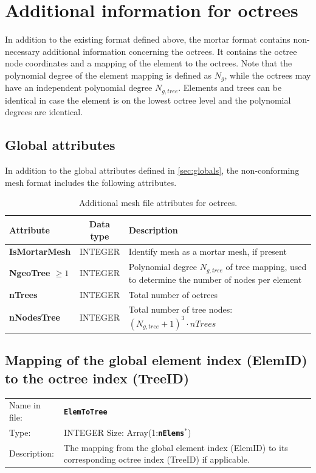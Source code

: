 \documentclass[a4paper,headsepline]{scrreprt}
\newcommand\Ngeo{N_g}
\newcommand\NgeoTree{N_{g,tree}}
\newcommand\ttbf[1]{\textbf{\texttt{#1}}}
\newcommand\nElems{\ttbf{nElems}}
\begin{document}
\newpage
\section{Additional information for octrees}

In addition to the existing format defined above, the mortar format contains non-necessary additional information concerning the octrees. It contains the octree node coordinates and a mapping of the element to the octrees. Note that the polynomial degree of the element mapping is defined as $\Ngeo$, while the octrees may have an independent polynomial degree $\NgeoTree$. Elements and trees can be identical in case the element is on the lowest octree level and the polynomial degrees are identical.


\subsection{Global attributes}
In addition to the global attributes defined in \ref{sec:globals}, the non-conforming mesh format includes the following attributes.

\begin{table}[h!]
\centering
\begin{tabularx}{1.0\textwidth}{|>{\bfseries\ttfamily}l|c|X|} \hline
\normalfont\textbf{Attribute}   & \textbf{Data type}  & \textbf{Description} \\ \hline\hline
IsMortarMesh  & INTEGER & Identify mesh as a mortar mesh, if present \\\hline
NgeoTree $\geq 1$ & INTEGER & Polynomial degree $\NgeoTree$ of tree mapping, used to determine the number of nodes per element \\\hline
nTrees        & INTEGER & Total number of octrees \\\hline
nNodesTree    & INTEGER & Total number of tree nodes: $(\NgeoTree+1)^3 \cdot nTrees$ \\\hline
\end{tabularx}
\caption{Additional mesh file attributes for octrees.}
\end{table}



\subsection{Mapping of the global element index (ElemID) to the octree index (TreeID) }
\begin{tabularx}{1.0\textwidth}{lX}
Name in  file: & \textbf{\texttt{ElemToTree}}\\
Type:         & INTEGER \quad Size: Array(1:\nElems$^*$) \\
Description:  & The mapping from the global element index (ElemID) to its corresponding octree index (TreeID) if applicable. \\
\end{tabularx}
\end{document}
